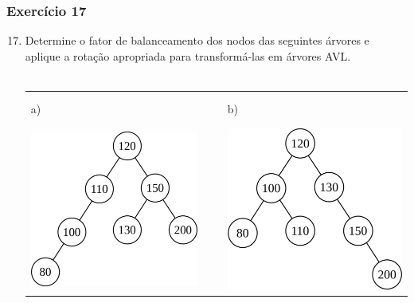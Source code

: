 \documentclass[aspectratio=169]{beamer}
\begin{document}
\begin{frame}[fragile]\frametitle{Exercício 17}
\begin{enumerate}
	\setcounter{enumi}{16}
	\item Determine o fator de balanceamento dos nodos das seguintes árvores e aplique a rotação apropriada para transformá-las em árvores AVL.\\~\\
\begin{tabular}{lll}
a) & ~ ~ & b)\\
\includegraphics[height=0.4\paperheight]{imagens/avl13.png} & ~ ~ &
\includegraphics[height=0.4\paperheight]{imagens/avl14.png} \\
\end{tabular}
\end{enumerate}
\end{frame}
\end{document}
